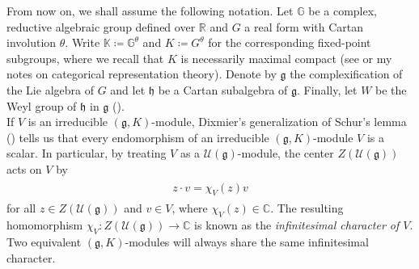\noindent From now on, we shall assume the following notation. Let $\mathbb{G}$ be a complex, reductive algebraic group defined over $\mathbb{R}$ and $G$ a real form with Cartan involution $\theta$. Write $\mathbb{K} \coloneqq \mathbb{G}^\theta$ and $K \coloneqq G^\theta$ for the corresponding fixed-point subgroups, where we recall that $K$ is necessarily maximal compact (see \cite[\S 3]{AC09} or my notes on categorical representation theory). Denote by $\mathfrak{g}$ the complexification of the Lie algebra of $G$ and let $\mathfrak{h}$ be a Cartan subalgebra of $\mathfrak{g}$. Finally, let $W$ be the Weyl group of $\mathfrak{h}$ in $\mathfrak{g}$ (\cite[Definition 0.2.5]{Vog81}).\\

\noindent If $V$ is an irreducible $(\mathfrak{g}, K)$-module, Dixmier's generalization of Schur's lemma (\cite[Proposition 5.19]{Kna13}) tells us that every endomorphism of an irreducible $(\mathfrak{g}, K)$-module $V$ is a scalar. In particular, by treating $V$ as a $\mathcal{U}(\mathfrak{g})$-module, the center $Z(\mathcal{U}(\mathfrak{g}))$ acts on $V$ by
\begin{align*}
\begin{split}
z \cdot v = \chi_V(z)v
\end{split}
\end{align*}
\noindent for all $z \in Z(\mathcal{U}(\mathfrak{g}))$ and $v \in V$, where $\chi_V(z)\in\mathbb{C}$. The resulting homomorphism $\chi_V : Z(\mathcal{U}(\mathfrak{g})) \to \mathbb{C}$ is known as the {\em infinitesimal character of $V$}. Two equivalent $(\mathfrak{g}, K)$-modules will always share the same infinitesimal character.\\

